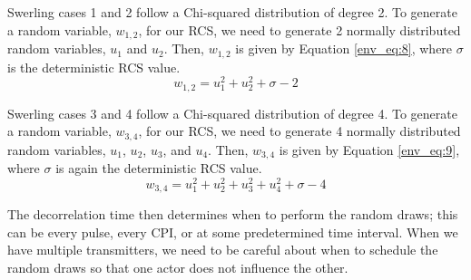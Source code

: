 Swerling cases 1 and 2 follow a Chi-squared distribution of degree 2. To generate a random variable, $w_{1,2}$, for our RCS, we need to generate 2 normally distributed random variables, $u_1$ and $u_2$. Then, $w_{1,2}$ is given by Equation \ref{env_eq:8}, where $\sigma$ is the deterministic RCS value.
\begin{equation}
  \label{env_eq:8}
w_{1,2} = u_1^2 + u_2^2 + \sigma - 2
  \end{equation}

Swerling cases 3 and 4 follow a Chi-squared distribution of degree 4. To generate a random variable, $w_{3,4}$, for our RCS, we need to generate 4 normally distributed random variables, $u_1$, $u_2$, $u_3$, and $u_4$. Then, $w_{3,4}$ is given by Equation \ref{env_eq:9}, where $\sigma$ is again the deterministic RCS value.
\begin{equation}
  \label{env_eq:9}
w_{3,4} = u_1^2 + u_2^2 + u_3^2 + u_4^2 + \sigma - 4
  \end{equation}
  
The decorrelation time then determines when to perform the random draws; this can be every pulse, every CPI, or at some predetermined time interval. When we have multiple transmitters, we need to be careful about when to schedule the random draws so that one actor does not influence the other.  